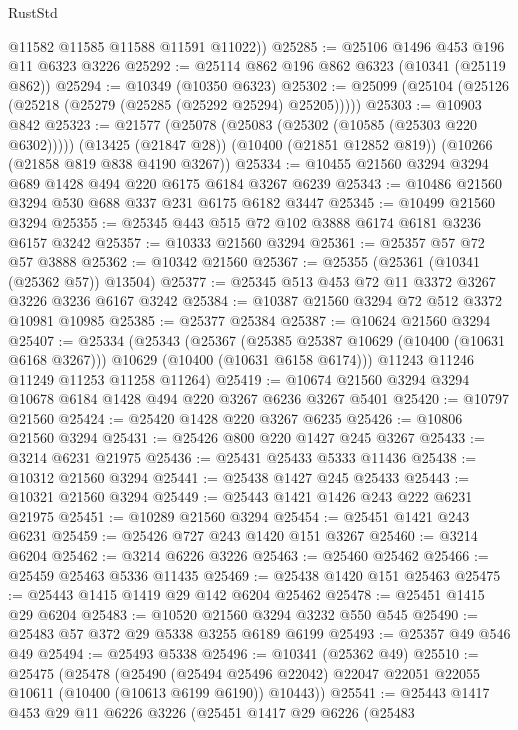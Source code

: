 \begin{lexlean}{RustStd}
\begin{coremodule}
{\begin{coremodule}
{{{{{{{{{{{{{{{{{{{{{{{{{        @11582
        @11585
        @11588
        @11591
        @11022))
@25285 := @25106 @1496 @453 @196 @11 @6323 @3226
@25292 := @25114 @862 @196 @862 @6323 (@10341 (@25119 @862))
@25294 := @10349 (@10350 @6323)
@25302 := @25099 (@25104 (@25126 (@25218 (@25279 (@25285 (@25292 @25294) @25205)))))
@25303 := @10903 @842
@25323 := @21577
    (@25078 (@25083 (@25302 (@10585 (@25303 @220 @6302)))))
    (@13425 (@21847 @28))
    (@10400 (@21851 @12852 @819))
    (@10266 (@21858 @819 @838 @4190 @3267))
@25334 := @10455 @21560 @3294 @3294 @689 @1428 @494 @220 @6175 @6184 @3267 @6239
@25343 := @10486 @21560 @3294 @530 @688 @337 @231 @6175 @6182 @3447
@25345 := @10499 @21560 @3294
@25355 := @25345 @443 @515 @72 @102 @3888 @6174 @6181 @3236 @6157 @3242
@25357 := @10333 @21560 @3294
@25361 := @25357 @57 @72 @57 @3888
@25362 := @10342 @21560
@25367 := @25355 (@25361 (@10341 (@25362 @57)) @13504)
@25377 := @25345 @513 @453 @72 @11 @3372 @3267 @3226 @3236 @6167 @3242
@25384 := @10387 @21560 @3294 @72 @512 @3372 @10981 @10985
@25385 := @25377 @25384
@25387 := @10624 @21560 @3294
@25407 := @25334
    (@25343
      (@25367
        (@25385 @25387 @10629 (@10400 (@10631 @6168 @3267)))
        @10629
        (@10400 (@10631 @6158 @6174)))
      @11243
      @11246
      @11249
      @11253
      @11258
      @11264)
@25419 := @10674 @21560 @3294 @3294 @10678 @6184 @1428 @494 @220 @3267 @6236 @3267 @5401
@25420 := @10797 @21560
@25424 := @25420 @1428 @220 @3267 @6235
@25426 := @10806 @21560 @3294
@25431 := @25426 @800 @220 @1427 @245 @3267
@25433 := @3214 @6231 @21975
@25436 := @25431 @25433 @5333 @11436
@25438 := @10312 @21560 @3294
@25441 := @25438 @1427 @245 @25433
@25443 := @10321 @21560 @3294
@25449 := @25443 @1421 @1426 @243 @222 @6231 @21975
@25451 := @10289 @21560 @3294
@25454 := @25451 @1421 @243 @6231
@25459 := @25426 @727 @243 @1420 @151 @3267
@25460 := @3214 @6204
@25462 := @3214 @6226 @3226
@25463 := @25460 @25462
@25466 := @25459 @25463 @5336 @11435
@25469 := @25438 @1420 @151 @25463
@25475 := @25443 @1415 @1419 @29 @142 @6204 @25462
@25478 := @25451 @1415 @29 @6204
@25483 := @10520 @21560 @3294 @3232 @550 @545
@25490 := @25483 @57 @372 @29 @5338 @3255 @6189 @6199
@25493 := @25357 @49 @546 @49
@25494 := @25493 @5338
@25496 := @10341 (@25362 @49)
@25510 := @25475
    (@25478
      (@25490
        (@25494 @25496 @22042)
        @22047
        @22051
        @22055
        @10611
        (@10400 (@10613 @6199 @6190))
        @10443))
@25541 := @25443
    @1417
    @453
    @29
    @11
    @6226
    @3226
    (@25451
      @1417
      @29
      @6226
      (@25483
}}}}}}}}}}}}}}}}}}}}}}}}}
\end{coremodule}}
\end{coremodule}
\end{lexlean}
